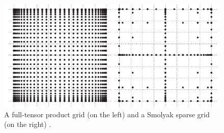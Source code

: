 \begin{figure}
  \centering
  \includegraphics[width=0.9\linewidth]{include/assets/integration-grids.pdf}
  \vspace{-1.0em}
  \caption{A full-tensor product grid (on the left) and a Smolyak sparse grid (on the right) \cite{eldred2008}.}
  \vspace{-1.0em}
\end{figure}
